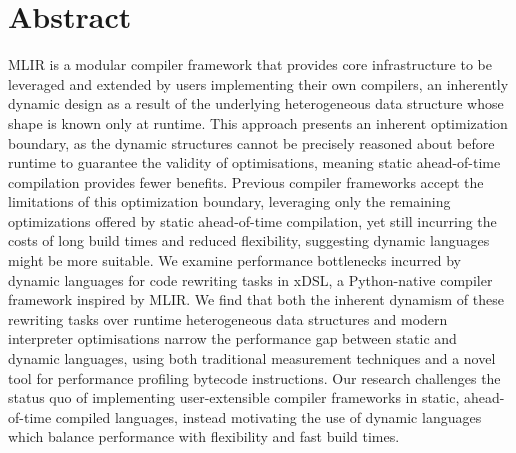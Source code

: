\chapter*{Abstract}


\makeatletter
{\large\textsl{\@title}}
\makeatother
\vspace{0.5em}

MLIR is a modular compiler framework that provides core infrastructure to be leveraged and extended by users implementing their own compilers, an inherently dynamic design as a result of the underlying heterogeneous data structure whose shape is known only at runtime. %
This approach presents an inherent optimization boundary, as the dynamic structures cannot be precisely reasoned about before runtime to guarantee the validity of optimisations, meaning static ahead-of-time compilation provides fewer benefits.
Previous compiler frameworks accept the limitations of this optimization boundary, leveraging only the remaining optimizations offered by static ahead-of-time compilation, yet still incurring the costs of long build times and reduced flexibility, suggesting dynamic languages might be more suitable.
We examine performance bottlenecks incurred by dynamic languages for code rewriting tasks in xDSL, a Python-native compiler framework inspired by MLIR.
We find that both the inherent dynamism of these rewriting tasks over runtime heterogeneous data structures and modern interpreter optimisations narrow the performance gap between static and dynamic languages, using both traditional measurement techniques and a novel tool for performance profiling bytecode instructions.
Our research challenges the status quo of implementing user-extensible compiler frameworks in static, ahead-of-time compiled languages, instead motivating the use of dynamic languages which balance performance with flexibility and fast build times.





